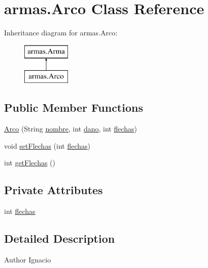 \hypertarget{classarmas_1_1_arco}{}\section{armas.\+Arco Class Reference}
\label{classarmas_1_1_arco}
Inheritance diagram for armas.\+Arco\+:\begin{figure}[H]
\begin{center}
\leavevmode
\includegraphics[height=2.000000cm]{classarmas_1_1_arco}
\end{center}
\end{figure}
\subsection*{Public Member Functions}
\begin{DoxyCompactItemize}
\item 
\mbox{\hyperlink{classarmas_1_1_arco_adb6cf1db5096d830f06f387246a9be6a}{Arco}} (String \mbox{\hyperlink{classarmas_1_1_arma_abdd717c561a99a3436dbfda8129b5581}{nombre}}, int \mbox{\hyperlink{classarmas_1_1_arma_a59396ee4b222360f19c8be08eb7d137b}{dano}}, int \mbox{\hyperlink{classarmas_1_1_arco_a20e5f5a5f70f01f9264a02ff7ee1b657}{flechas}})
\item 
void \mbox{\hyperlink{classarmas_1_1_arco_a4e931b2d2a8649b74faee40cf06220ec}{set\+Flechas}} (int \mbox{\hyperlink{classarmas_1_1_arco_a20e5f5a5f70f01f9264a02ff7ee1b657}{flechas}})
\item 
int \mbox{\hyperlink{classarmas_1_1_arco_a1c85d29bd323b4464da345ccc835c041}{get\+Flechas}} ()
\end{DoxyCompactItemize}
\subsection*{Private Attributes}
\begin{DoxyCompactItemize}
\item 
int \mbox{\hyperlink{classarmas_1_1_arco_a20e5f5a5f70f01f9264a02ff7ee1b657}{flechas}}
\end{DoxyCompactItemize}


\subsection{Detailed Description}
\begin{DoxyAuthor}{Author}
Ignacio 
\end{DoxyAuthor}


